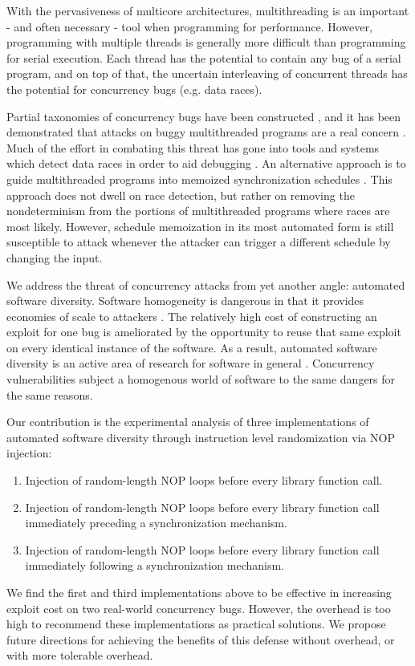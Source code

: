 With the pervasiveness of multicore architectures, multithreading is an important - and often necessary - tool when programming for performance.
However, programming with multiple threads is generally more difficult than programming for serial execution.
Each thread has the potential to contain any bug of a serial program, and on top of that, the uncertain interleaving of concurrent threads has the potential for concurrency bugs (e.g. data races).

Partial taxonomies of concurrency bugs have been constructed \cite{Farchi2003, Lu2008}, and it has been demonstrated that attacks on buggy multithreaded programs are a real concern \cite{Yang2012}.
Much of the effort in combating this threat has gone into tools and systems which detect data races in order to aid debugging \cite{Savage1997, Flanagan2004, Laadan2011, Pratikakis2011, Kasikci2013}.
An alternative approach is to guide multithreaded programs into memoized synchronization schedules \cite{Cui2010}.
This approach does not dwell on race detection, but rather on removing the nondeterminism from the portions of multithreaded programs where races are most likely.
However, schedule memoization in its most automated form is still susceptible to attack whenever the attacker can trigger a different schedule by changing the input.

We address the threat of concurrency attacks from yet another angle: automated software diversity.
Software homogeneity is dangerous in that it provides economies of scale to attackers \cite{Geer2003b}.
The relatively high cost of constructing an exploit for one bug is ameliorated by the opportunity to reuse that same exploit on every identical instance of the software.
As a result, automated software diversity is an active area of research for software in general \cite{Larsen2014}.
Concurrency vulnerabilities subject a homogenous world of software to the same dangers for the same reasons.

Our contribution is the experimental analysis of three implementations of automated software diversity through instruction level randomization via NOP injection:
\begin{enumerate}
	\item Injection of random-length NOP loops before every library function call.
	\item Injection of random-length NOP loops before every library function call immediately preceding a synchronization mechanism.
	\item Injection of random-length NOP loops before every library function call immediately following a synchronization mechanism.
\end{enumerate}

We find the first and third implementations above to be effective in increasing exploit cost on two real-world concurrency bugs.
However, the overhead is too high to recommend these implementations as practical solutions.
We propose future directions for achieving the benefits of this defense without overhead, or with more tolerable overhead.